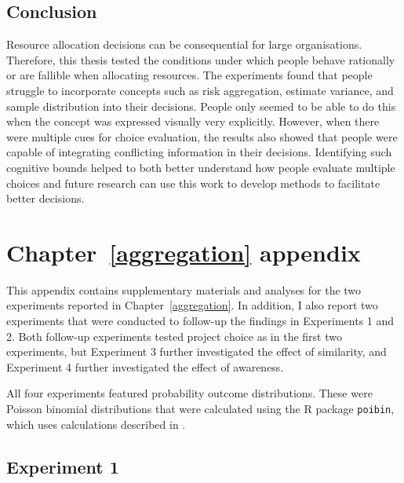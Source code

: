 \documentclass[a4paper, nobind, dvipsnames]{templates/ociamthesis}
\theoremstyle{definition}
\theoremstyle{definition}
\theoremstyle{definition}
\theoremstyle{definition}
\theoremstyle{remark}
\begin{document}
\section{Conclusion}

Resource allocation decisions can be consequential for large organisations.
Therefore, this thesis tested the conditions under which people behave
rationally or are fallible when allocating resources. The experiments found that
people struggle to incorporate concepts such as risk aggregation, estimate
variance, and sample distribution into their decisions. People only seemed to be
able to do this when the concept was expressed visually very explicitly.
However, when there were multiple cues for choice evaluation, the results also
showed that people were capable of integrating conflicting information in their
decisions. Identifying such cognitive bounds helped to both better understand
how people evaluate multiple choices and future research can use this work to
develop methods to facilitate better decisions.

\newpage

\printbibliography[segment=\therefsegment,heading=subbibintoc]

\appendix


\hypertarget{aggregation-appendix}{%
\chapter{Chapter~\ref{aggregation} appendix}\label{aggregation-appendix}}

\minitoc

This appendix contains supplementary materials and analyses for the two
experiments reported in Chapter~\ref{aggregation}. In addition, I also report
two experiments that were conducted to follow-up the findings in Experiments 1
and 2. Both follow-up experiments tested project choice as in the first two
experiments, but Experiment 3 further investigated the effect of similarity, and
Experiment 4 further investigated the effect of awareness.

All four experiments featured probability outcome distributions. These were
Poisson binomial distributions that were calculated using the R package
\texttt{poibin}, which uses calculations described in \textcite{hong2013}.

\section{Experiment 1}
\end{document}
